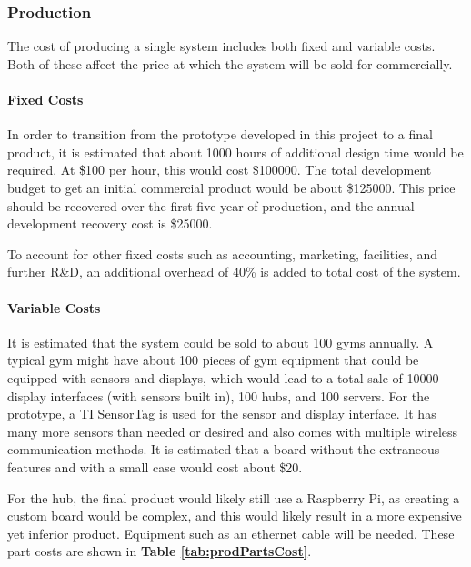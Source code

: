 \documentclass[PPFS.tex]{template/subfiles}
\begin{document}
        \subsubsection{Production}
        The cost of producing a single system includes both fixed and variable costs. Both of these affect the price at which the system will be sold for commercially.
        
        \paragraph{Fixed Costs}	
        In order to transition from the prototype developed in this project to a final product, it is estimated that about 1000 hours of additional design time would be required. At \$100 per hour, this would cost \$100000. The total development budget to get an initial commercial product would be about \$125000. This price should be recovered over the first five year of production, and the annual development recovery cost is \$25000.
        
        To account for other fixed costs such as accounting, marketing, facilities, and further R\&D, an additional overhead of 40\% is added to total cost of the system.
        
        \paragraph{Variable Costs}
        
        It is estimated that the system could be sold to about 100 gyms annually. A typical gym might have about 100 pieces of gym equipment that could be equipped with sensors and displays, which would lead to a total sale of 10000 display interfaces (with sensors built in), 100 hubs, and 100 servers. 
        For the prototype, a TI SensorTag is used for the sensor and display interface. It has many more sensors than needed or desired and also comes with multiple wireless communication methods. It is estimated that a board without the extraneous features and with a small case would cost about \$20.
        
        For the hub, the final product would likely still use a Raspberry Pi, as creating a custom board would be complex, and this would likely result in a more expensive yet inferior product. Equipment such as an ethernet cable will be needed.
        These part costs are shown in \textbf{Table \ref{tab:prodPartsCost}}.
        
\end{document}
